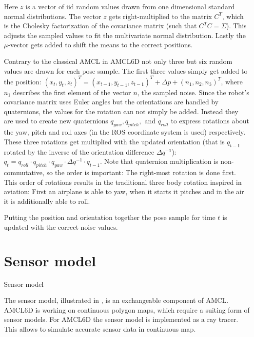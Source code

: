 \documentclass[Thesis.tex]{subfiles}
\begin{document}
Here $z$ is a vector of \gls{iid} random values drawn from one dimensional standard normal distributions. The vector $z$ gets right-multiplied to the matrix $C^T$, which is the Cholesky factorization of the covariance matrix (such that $C^TC = \Sigma$). This adjusts the sampled values to fit the multivariate normal distribution. Lastly the $\mu$-vector gets added to shift the means to the correct positions.

Contrary to the classical \gls{AMCL} in \gls{AMCL6D} not only three but six random values are drawn for each pose sample. The first three values simply get added to the position: $(x_t, y_t, z_t)^T = (x_{t-1}, y_{t-1}, z_{t-1})^T + \Delta p + (n_1, n_2, n_3)^T$, where $n_1$ describes the first element of the vector $n$, the sampled noise.
Since the robot's covariance matrix uses Euler angles but the orientations are handled by quaternions, the values for the rotation can not simply be added. Instead they are used to create new quaternions $q_{yaw}, q_{pitch},$ and $q_{roll}$ to express rotations about the yaw, pitch and roll axes (in  the \gls{ROS} coordinate system is used) respectively. These three rotations get multiplied with the updated orientation (that is $q_{t-1}$ rotated by the inverse of the orientation difference $\Delta q^{-1}$): $q_{t} = q_{roll} \cdot q_{pitch} \cdot q_{yaw} \cdot \Delta q^{-1} \cdot q_{t-1}$. Note that quaternion multiplication is non-commutative, so the order is important: The right-most rotation is done first. This order of rotations results in the traditional three body rotation inspired in aviation: First an airplane is able to yaw, when it starts it pitches and in the air it is additionally able to roll.

Putting the position and orientation together the pose sample for time $t$ is updated with the correct noise values.
%
%
%
%
%
%
\section{Sensor model}
%
\begin{algorithm}[!htp]
\caption{Sensor model}
\label{alg:sensormodel}

\end{algorithm}
%
The sensor model, illustrated in , is an exchangeable component of \gls{AMCL}. \gls{AMCL6D} is working on continuous polygon maps, which require a suiting form of sensor models. For \gls{AMCL6D} the sensor model is implemented as a ray tracer. This allows to simulate accurate sensor data in continuous map. 
\end{document}
